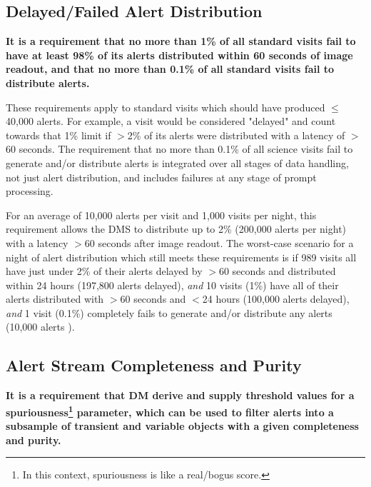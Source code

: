 \documentclass[DM,authoryear,toc]{lsstdoc}
\begin{document}
\subsection{Delayed/Failed \gls{Alert} Distribution}\label{ssec:OTR1}

{\bf It is a requirement that no more than 1\% of all standard visits fail to have at least 98\% of its alerts distributed within 60 seconds of image readout, and that no more than 0.1\% of all standard visits fail to distribute alerts.}

These requirements apply to standard visits which should have produced $\leq$40,000 alerts. For example, a visit would be considered "delayed" and count towards that 1\% limit if $>$2\% of its alerts were distributed with a latency of $>$60 seconds. The requirement that no more than 0.1\% of all science visits fail to generate and/or distribute alerts is integrated over all stages of data handling, not just alert distribution, and includes failures at any stage of prompt processing.

For an average of 10,000 alerts per visit and 1,000 visits per night, this requirement allows the \gls{DMS} to distribute up to 2\% (200,000 alerts per night) with a latency $>$60 seconds after image readout. 
The worst-case scenario for a night of alert distribution which still meets these requirements is if 989 visits all have just under 2\% of their alerts delayed by $>$60 seconds and distributed within 24 hours (197,800 alerts delayed), {\it and} 10 visits (1\%) have all of their alerts distributed with $>$60 seconds and $<$24 hours (100,000 alerts delayed), {\it and} 1 visit (0.1\%) completely fails to generate and/or distribute any alerts (10,000 alerts ).


\subsection{Alert Stream Completeness and Purity}\label{ssec:comp_pure}

{\bf It is a requirement that \gls{DM} derive and supply threshold values for a spuriousness\footnote{In this context, spuriousness is like a real/bogus score.} parameter, which can be used to filter alerts into a subsample of \gls{transient} and variable objects with a given completeness and purity.}
\end{document}
